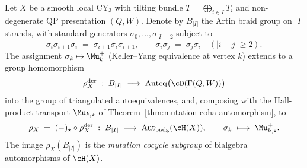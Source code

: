 \begin{theorem}
\label{thm:mutation-cocycle}
Let $X$ be a smooth local CY$_3$ with tilting bundle
$T = \bigoplus_{i \in I} T_i$ and non-degenerate QP presentation $(Q, W)$.
Denote by $B_{|I|}$ the Artin braid group on $|I|$ strands, with standard
generators $\sigma_0, \ldots, \sigma_{|I| - 2}$ subject to
\[
 \sigma_i \sigma_{i+1} \sigma_i \;=\; \sigma_{i+1} \sigma_i \sigma_{i+1},
 \qquad
 \sigma_i \sigma_j \;=\; \sigma_j \sigma_i \quad (|i - j| \geq 2).
\]
The assignment $\sigma_k \mapsto \Mu_k^{+}$ (Keller--Yang equivalence at
vertex $k$) extends to a group homomorphism
\[
 \rho_X^{\mathrm{der}} \;:\; B_{|I|} \;\longrightarrow\;
 \mathrm{Auteq}\bigl(\cD(\Gamma(Q, W))\bigr)
\]
into the group of triangulated autoequivalences, and, composing with the
Hall-product transport $\Mu_{k,\star}$ of
Theorem~\ref{thm:mutation-coha-automorphism}, to
\[
 \rho_X \;=\; (-)_{\star} \circ \rho_X^{\mathrm{der}} \;:\; B_{|I|}
 \;\longrightarrow\; \mathrm{Aut}_{\mathrm{bialg}}(\cH(X)),
 \qquad \sigma_k \;\longmapsto\; \Mu_{k,\star}^{+}.
\]
The image $\rho_X(B_{|I|})$ is the \emph{mutation cocycle subgroup} of
bialgebra automorphisms of $\cH(X)$.
\end{theorem}

